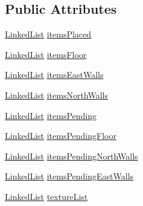 \subsection*{Public Attributes}
\begin{DoxyCompactItemize}
\item 
\hyperlink{classLinkedList}{Linked\-List} \hyperlink{classShipItems_a3e71d1f18d3eee132394a9c524cb43e4}{items\-Placed}
\item 
\hyperlink{classLinkedList}{Linked\-List} \hyperlink{classShipItems_a737ad4ba94bb66145177591ce4540d8b}{items\-Floor}
\item 
\hyperlink{classLinkedList}{Linked\-List} \hyperlink{classShipItems_ad6fa92d081c83d2df321d0771b32add1}{items\-East\-Walls}
\item 
\hyperlink{classLinkedList}{Linked\-List} \hyperlink{classShipItems_af103aec8600076fb6c9520aaec193747}{items\-North\-Walls}
\item 
\hyperlink{classLinkedList}{Linked\-List} \hyperlink{classShipItems_a4549ab087c77cf3bfade68ddec7ef8ee}{items\-Pending}
\item 
\hyperlink{classLinkedList}{Linked\-List} \hyperlink{classShipItems_a0001695d214b41ca614297329504f46e}{items\-Pending\-Floor}
\item 
\hyperlink{classLinkedList}{Linked\-List} \hyperlink{classShipItems_ad5d679f77e2cd8eba65fdac2dcf814ab}{items\-Pending\-North\-Walls}
\item 
\hyperlink{classLinkedList}{Linked\-List} \hyperlink{classShipItems_a009d6b07df69f4f5d9c912b49fa678c4}{items\-Pending\-East\-Walls}
\item 
\hyperlink{classLinkedList}{Linked\-List} \hyperlink{classShipItems_adb0d04e59dc21442a04199a6d0043011}{texture\-List}
\end{DoxyCompactItemize}


